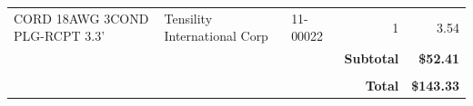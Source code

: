\documentclass[journal,compsoc]{IEEEtran}
\begin{document}
\begin{table}[]
\begin{tabular}{|rrr|r|r|}
    \multicolumn{1}{|l}{CORD 18AWG 3COND PLG-RCPT 3.3'} & \multicolumn{1}{l}{Tensility International Corp} & \multicolumn{1}{l}{11-00022} & \multicolumn{1}{r}{1} & 3.54 \\
\cmidrule{4-5}          &       &       & \cellcolor[rgb]{ .608,  .761,  .902} \textbf{Subtotal} & \cellcolor[rgb]{ .608,  .761,  .902} \textbf{\$52.41} \\
    \midrule
          &       & \multicolumn{1}{r}{} & \multicolumn{1}{r}{} &  \\
\cmidrule{4-5}          &       &       & \cellcolor[rgb]{ .608,  .761,  .902} \textbf{Total} & \cellcolor[rgb]{ .608,  .761,  .902} \textbf{\$143.33} \\
    \bottomrule
    \end{tabular}%
  \label{tab:addlabel}%
\end{table}%
\twocolumn
%
%
%
\end{document}

